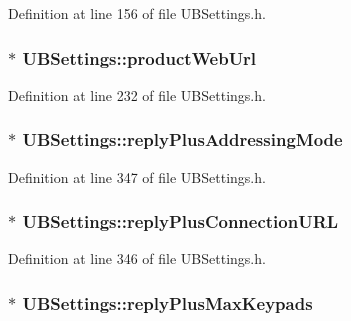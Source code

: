 Definition at line 156 of file U\-B\-Settings.\-h.

\hypertarget{class_u_b_settings_aa5b30a6658aa14bfde4232d8ce7a2abc}{
\subsubsection[{product\-Web\-Url}]{$\ast$ U\-B\-Settings\-::product\-Web\-Url}}\label{db/d66/class_u_b_settings_aa5b30a6658aa14bfde4232d8ce7a2abc}


Definition at line 232 of file U\-B\-Settings.\-h.

\hypertarget{class_u_b_settings_a2ba584c3e49ef6154fdee73bdc41546a}{
\subsubsection[{reply\-Plus\-Addressing\-Mode}]{$\ast$ U\-B\-Settings\-::reply\-Plus\-Addressing\-Mode}}\label{db/d66/class_u_b_settings_a2ba584c3e49ef6154fdee73bdc41546a}


Definition at line 347 of file U\-B\-Settings.\-h.

\hypertarget{class_u_b_settings_ac615d44f786768589ce4169d1a40b221}{
\subsubsection[{reply\-Plus\-Connection\-U\-R\-L}]{$\ast$ U\-B\-Settings\-::reply\-Plus\-Connection\-U\-R\-L}}\label{db/d66/class_u_b_settings_ac615d44f786768589ce4169d1a40b221}


Definition at line 346 of file U\-B\-Settings.\-h.

\hypertarget{class_u_b_settings_a5a1f043b21863c24b34640600a9db784}{
\subsubsection[{reply\-Plus\-Max\-Keypads}]{$\ast$ U\-B\-Settings\-::reply\-Plus\-Max\-Keypads}}\label{db/d66/class_u_b_settings_a5a1f043b21863c24b34640600a9db784}


